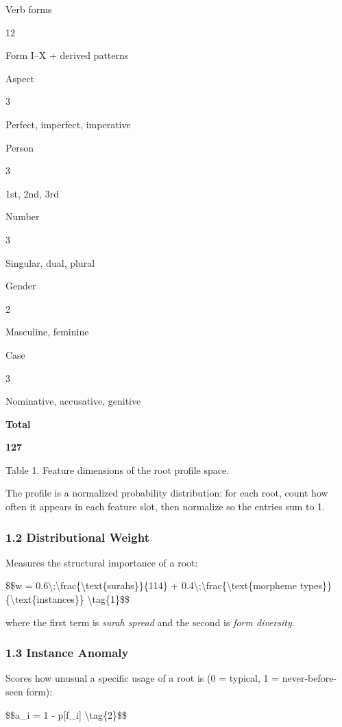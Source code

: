 \documentclass[12pt,a4paper]{article}
\begin{document}
Verb forms

12

Form I--X + derived patterns

Aspect

3

Perfect, imperfect, imperative

Person

3

1st, 2nd, 3rd

Number

3

Singular, dual, plural

Gender

2

Masculine, feminine

Case

3

Nominative, accusative, genitive

\textbf{Total}

\textbf{127}

Table 1. Feature dimensions of the root profile space.

The profile is a normalized probability distribution: for each root,
count how often it appears in each feature slot, then normalize so the
entries sum to 1.

\subsubsection{1.2 Distributional Weight}\label{distributional-weight}

Measures the structural importance of a root:

\$\$w =
0.6\textbackslash;\textbackslash frac\{\textbar\textbackslash text\{surahs\}\textbar\}\{114\}
+
0.4\textbackslash;\textbackslash frac\{\textbar\textbackslash text\{morpheme
types\}\textbar\}\{\textbar\textbackslash text\{instances\}\textbar\}
\textbackslash tag\{1\}\$\$

where the first term is \emph{surah spread} and the second is \emph{form
diversity}.

\subsubsection{1.3 Instance Anomaly}\label{instance-anomaly}

Scores how unusual a specific usage of a root is (0 = typical, 1 =
never-before-seen form):

\$\$a\_i = 1 - p{[}f\_i{]} \textbackslash tag\{2\}\$\$
\end{document}
